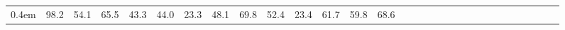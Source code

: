 \begin{tabular}{cc|cccccccccccccccccccccccccccc}
0.4em} & \hspace{-0.9em}98.2\hspace{-0.4em} & \hspace{-0.9em}54.1\hspace{-0.4em} & \hspace{-0.9em}65.5\hspace{-0.4em} & \hspace{-0.9em}43.3\hspace{-0.4em} & \hspace{-0.9em}44.0\hspace{-0.4em} & \hspace{-0.9em}23.3\hspace{-0.4em} & \hspace{-0.9em}48.1\hspace{-0.4em} & \hspace{-0.9em}69.8\hspace{-0.4em} & \hspace{-0.9em}52.4\hspace{-0.4em} & \hspace{-0.9em}23.4\hspace{-0.4em} & \hspace{-0.9em}61.7\hspace{-0.4em} & \hspace{-0.9em}59.8\hspace{-0.4em} & \hspace{-0.9em}68.6\hspace{-0.4em} 
        \\

\end{tabular}
